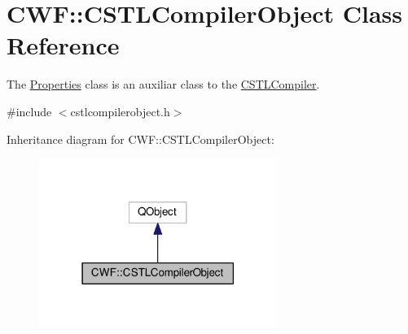 \hypertarget{class_c_w_f_1_1_c_s_t_l_compiler_object}{\section{C\+W\+F\+:\+:C\+S\+T\+L\+Compiler\+Object Class Reference}
\label{class_c_w_f_1_1_c_s_t_l_compiler_object}
}


The \hyperlink{class_c_w_f_1_1_properties}{Properties} class is an auxiliar class to the \hyperlink{class_c_w_f_1_1_c_s_t_l_compiler}{C\+S\+T\+L\+Compiler}.  




{\ttfamily \#include $<$cstlcompilerobject.\+h$>$}



Inheritance diagram for C\+W\+F\+:\+:C\+S\+T\+L\+Compiler\+Object\+:\nopagebreak
\begin{figure}[H]
\begin{center}
\leavevmode
\includegraphics[width=219pt]{class_c_w_f_1_1_c_s_t_l_compiler_object__inherit__graph}
\end{center}
\end{figure}
